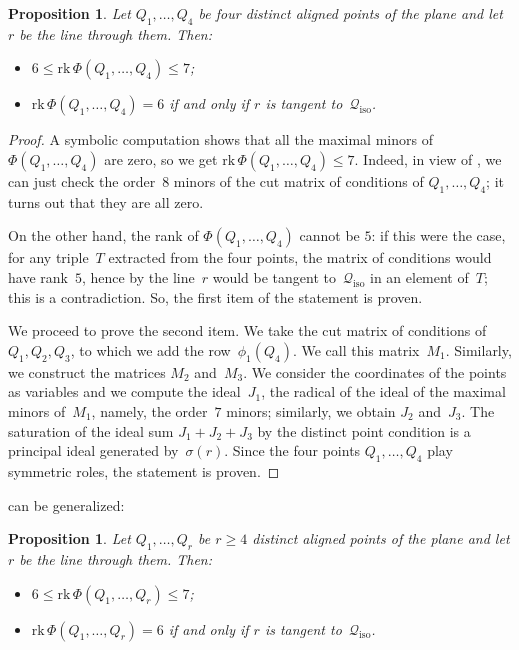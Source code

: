 \documentclass[a4paper, 11pt, reqno]{amsart}
\theoremstyle{plain}
\newtheorem{prop}[lemma]{Proposition}
\theoremstyle{definition}
\newcommand{\rk}{\ensuremath{\mathrm{rk}}}
\newcommand{\iso}{\mathcal{Q}_{\mathrm{iso}}}
\begin{document}
\begin{prop}
\label{proposition:four_aligned}
Let $Q_1, \dotsc, Q_4$ be four distinct aligned points of the plane and
let $r$ be the line through them. Then:
%
\begin{itemize}
  \item $6 \leq \rk \,\Phi(Q_1, \dotsc, Q_4) \leq 7$;
  \item $\rk \,\Phi(Q_1, \dotsc, Q_4) = 6$ if and only if $r$ is tangent to~$\iso$.
\end{itemize}
%
\end{prop}
\begin{proof}
A symbolic computation shows that all the maximal minors of~$\Phi(Q_1, \dotsc, Q_4)$ are zero, so we get 
$\rk \, \Phi(Q_1, \dotsc, Q_4) \leq 7$.
Indeed, in view of , we can just check the order~$8$ minors of the cut matrix of conditions of $Q_1, \dotsc, Q_4$;
it turns out that they are all zero.

On the other hand, the rank of $\Phi(Q_1, \dotsc, Q_4)$ cannot be $5$:
if this were the case, for any triple~$T$ extracted from the four points, the matrix of conditions would have rank~$5$, hence by  the line~$r$ would be tangent to~$\iso$ in an element of~$T$; this is a contradiction.
So, the first item of the statement is proven.

We proceed to prove the second item.
We take the cut matrix of conditions of~$Q_1, Q_2, Q_3$, to which we add the row~$\phi_1(Q_4)$.
We call this matrix~$M_1$.
Similarly, we construct the matrices $M_2$ and~$M_3$.
We consider the coordinates of the points as variables and we compute the ideal~$J_1$,
the radical of the ideal of the maximal minors of~$M_1$, namely, the order~$7$ minors;
similarly, we obtain $J_2$ and~$J_3$.
The saturation of the ideal sum $J_1 + J_2 + J_3$ by the distinct point condition is a principal ideal generated by~$\sigma(r)$.
Since the four points $Q_1, \dotsc, Q_4$ play symmetric roles, the statement is proven.
\end{proof}

 can be generalized:

\begin{prop}
\label{proposition:n_aligned}
Let $Q_1, \dotsc, Q_r$ be $r\geq 4$ distinct aligned points of the plane and
let $r$ be the line through them. Then:
%
\begin{itemize}
  \item $6 \leq \rk \,\Phi(Q_1, \dotsc, Q_r) \leq 7$;
  \item $\rk \,\Phi(Q_1, \dotsc, Q_r) = 6$ if and only if $r$ is tangent to~$\iso$.
\end{itemize}
%
\end{prop}
\end{document}
